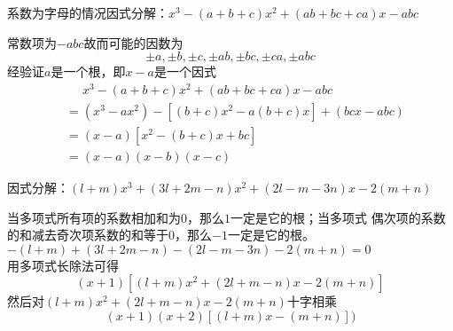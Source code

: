 \documentclass[windows,csize4]{BHCexam}
\begin{document}
\begin{groups}
\begin{questions}[]
        \question[5] 系数为字母的情况因式分解：$x^3-(a+b+c)x^2+(ab+bc+ca)x-abc$
        \begin{solution}{0.5cm}
            \methodonly 常数项为$-abc$故而可能的因数为
            \[\pm a, \pm b, \pm c, \pm ab, \pm bc, \pm ca, \pm abc \]
            经验证$a$是一个根，即$x-a$是一个因式
            \[
                \begin{aligned}
                     & \phantom{=} x^3-(a+b+c)x^2+(ab+bc+ca)x-abc \\
                     & =(x^3-ax^2)-[(b+c)x^2-a(b+c)x]+(bcx-abc)   \\
                     & =(x-a)[x^2-(b+c)x+bc]                      \\
                     & =(x-a)(x-b)(x-c)
                \end{aligned}
            \]
        \end{solution}
        \vspace{3.5cm}

        \question[5] 因式分解：$(l+m)x^3+(3l+2m-n)x^2+(2l-m-3n)x-2(m+n)$
        \begin{solution}{0.5cm}
            \methodonly 当多项式所有项的系数相加和为$0$，那么$1$一定是它的根；当多项式
            偶次项的系数的和减去奇次项系数的和等于$0$，那么$-1$一定是它的根。
            $-(l+m)+(3l+2m-n)-(2l-m-3n)-2(m+n)=0$ \\
            用多项式长除法可得
            \[
                (x+1)[(l+m)x^2+(2l+m-n)x-2(m+n)]
            \]
            然后对$(l+m)x^2+(2l+m-n)x-2(m+n)$十字相乘 \\
            \[
                (x+1)(x+2)[(l+m)x-(m+n)])
            \]

        \end{solution}
        \vspace{3.5cm}

    \end{questions}
\end{groups}
\end{document}
